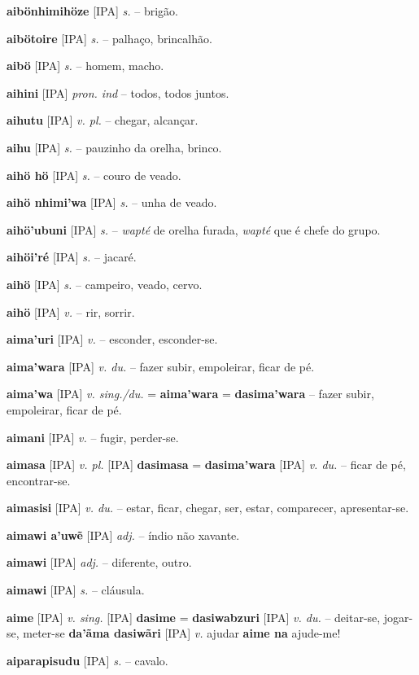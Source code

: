 \textbf{aibönhimihöze} [IPA] \textit{s.} -- brigão.

\textbf{aibötoire} [IPA] \textit{s.} -- palhaço, brincalhão.

\textbf{aibö} [IPA] \textit{s.} -- homem, macho.

\textbf{aihini} [IPA] \textit{pron. ind} -- todos, todos juntos.

\textbf{aihutu} [IPA] \textit{v. pl.} -- chegar, alcançar.

\textbf{aihu} [IPA] \textit{s.} -- pauzinho da orelha, brinco.

\textbf{aihö hö} [IPA] \textit{s.} -- couro de veado.

\textbf{aihö nhimi'wa} [IPA] \textit{s.} -- unha de veado.

\textbf{aihö'ubuni} [IPA] \textit{s.} -- \textit{wapté} de orelha furada, \textit{wapté} que é chefe do grupo.

\textbf{aihöi'ré} [IPA] \textit{s.} -- jacaré.

\textbf{aihö} [IPA] \textit{s.} -- campeiro, veado, cervo.

\textbf{aihö} [IPA] \textit{v.} -- rir, sorrir.

\textbf{aima'uri} [IPA] \textit{v.} -- esconder, esconder-se.

\textbf{aima'wara} [IPA] \textit{v. du.} -- fazer subir, empoleirar, ficar de pé.

\textbf{aima'wa} [IPA] \textit{v. sing./du.} = \textbf{aima'wara} = \textbf{dasima'wara} -- fazer subir, empoleirar, ficar de pé.

\textbf{aimani} [IPA] \textit{v.} -- fugir, perder-se.

\textbf{aimasa} [IPA] \textit{v. pl.} [IPA] \textbf{dasimasa} = \textbf{dasima'wara} [IPA] \textit{v. du.} -- ficar de pé, encontrar-se.

\textbf{aimasisi} [IPA] \textit{v. du.} -- estar, ficar, chegar, ser, estar, comparecer, apresentar-se.

\textbf{aimawi a'uwẽ} [IPA] \textit{adj.} -- índio não xavante.

\textbf{aimawi} [IPA] \textit{adj.} -- diferente, outro.

\textbf{aimawi} [IPA] \textit{s.} -- cláusula.

\textbf{aime} [IPA] \textit{v. sing.} [IPA] \textbf{dasime} = \textbf{dasiwabzuri} [IPA] \textit{v. du.} -- deitar-se, jogar-se, meter-se  \textbf{da'ãma dasiwãri} [IPA] \textit{v.} ajudar  \textbf{aime na} ajude-me!

\textbf{aiparapisudu} [IPA] \textit{s.} -- cavalo.

